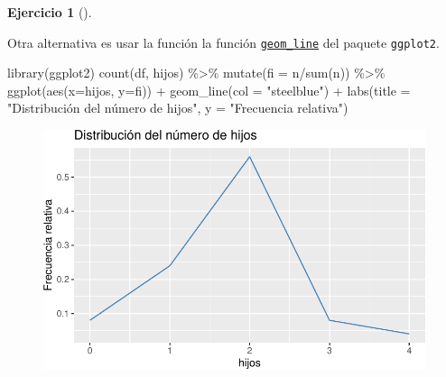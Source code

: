 \documentclass[
  a4paper,
]{scrreport}
\newenvironment{Shaded}{\begin{snugshade}}{\end{snugshade}}
\newcommand{\AttributeTok}[1]{\textcolor[rgb]{0.40,0.45,0.13}{#1}}
\newcommand{\FunctionTok}[1]{\textcolor[rgb]{0.28,0.35,0.67}{#1}}
\newcommand{\NormalTok}[1]{\textcolor[rgb]{0.00,0.23,0.31}{#1}}
\newcommand{\SpecialCharTok}[1]{\textcolor[rgb]{0.37,0.37,0.37}{#1}}
\newcommand{\StringTok}[1]{\textcolor[rgb]{0.13,0.47,0.30}{#1}}
\theoremstyle{definition}
\newtheorem{exercise}{Ejercicio}[chapter]
\theoremstyle{remark}
\begin{document}
\begin{exercise}[]
\begin{tcolorbox}[enhanced jigsaw, coltitle=black, breakable, bottomtitle=1mm, colbacktitle=quarto-callout-tip-color!10!white, rightrule=.15mm, opacityback=0, opacitybacktitle=0.6, left=2mm, colframe=quarto-callout-tip-color-frame, title=\textcolor{quarto-callout-tip-color}{\faLightbulb}\hspace{0.5em}{Solución 2}, toprule=.15mm, toptitle=1mm, arc=.35mm, colback=white, titlerule=0mm, bottomrule=.15mm, leftrule=.75mm]

Otra alternativa es usar la función la función
\href{https://aprendeconalf.es/manual-r/07-graficos.html\#diagramas-de-lineas}{\texttt{geom\_line}}
del paquete \texttt{ggplot2}.

\begin{Shaded}
\begin{Highlighting}[]
\FunctionTok{library}\NormalTok{(ggplot2)}
\FunctionTok{count}\NormalTok{(df, hijos) }\SpecialCharTok{\%\textgreater{}\%} 
    \FunctionTok{mutate}\NormalTok{(}\AttributeTok{fi =}\NormalTok{ n}\SpecialCharTok{/}\FunctionTok{sum}\NormalTok{(n)) }\SpecialCharTok{\%\textgreater{}\%}
    \FunctionTok{ggplot}\NormalTok{(}\FunctionTok{aes}\NormalTok{(}\AttributeTok{x=}\NormalTok{hijos, }\AttributeTok{y=}\NormalTok{fi)) }\SpecialCharTok{+}
    \FunctionTok{geom\_line}\NormalTok{(}\AttributeTok{col =} \StringTok{"steelblue"}\NormalTok{) }\SpecialCharTok{+}
    \FunctionTok{labs}\NormalTok{(}\AttributeTok{title =} \StringTok{"Distribución del número de hijos"}\NormalTok{, }\AttributeTok{y =} \StringTok{"Frecuencia relativa"}\NormalTok{)}
\end{Highlighting}
\end{Shaded}

\begin{figure}[H]

{\centering \includegraphics{./03-frecuencias-graficos_files/figure-pdf/unnamed-chunk-9-1.pdf}

}

\end{figure}

\end{tcolorbox}

\end{exercise}
\end{document}
